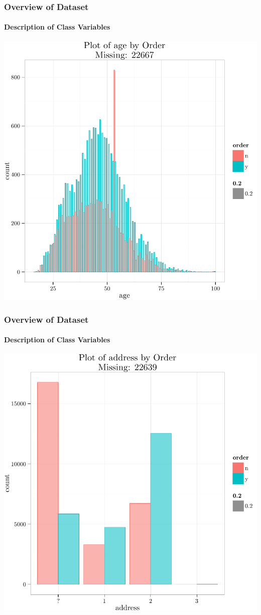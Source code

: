 \documentclass[xcolor=dvipsnames,gray,mathserif]{beamer}
\begin{document}
\begin{frame}
   \frametitle{Overview of Dataset}
   \framesubtitle{Description of Class Variables}

   \centerline{\includegraphics[width=.8\linewidth,height=.8\linewidth]{./figs/graphics-SingleDimPlot7}}
\end{frame}
\begin{frame}
   \frametitle{Overview of Dataset}
   \framesubtitle{Description of Class Variables}

   \centerline{\includegraphics[width=.8\linewidth,height=.8\linewidth]{./figs/graphics-SingleDimPlot8}}
\end{frame}
\end{document}
